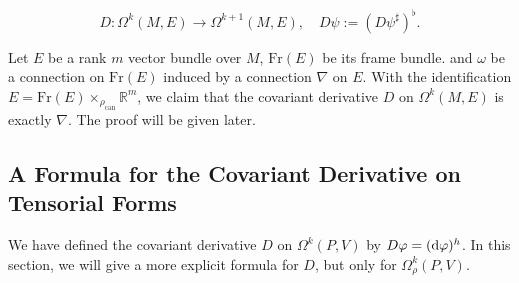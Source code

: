 \begin{equation*}
    D: \Omega^k(M, E) \to \Omega^{k+1}(M, E), \quad D\psi := (D\psi^\sharp)^\flat.
\end{equation*}
\begin{example}
    Let $E$ be a rank $m$ vector bundle over $M$, $\mathrm{Fr}(E)$ be its frame bundle.
    and $\omega$ be a connection on $\mathrm{Fr}(E)$ induced by a connection $\nabla$ on $E$. 
    With the identification $E = \mathrm{Fr}(E)\times_{\rho_{\mathrm{can}}}\mathbb{R}^m$, 
    we claim that the covariant derivative $D$ on $\Omega^k(M, E)$ is exactly $\nabla$. 
    The proof will be given later. 
\end{example}

\subsection{A Formula for the Covariant Derivative on Tensorial Forms}
We have defined the covariant derivative $D$ on $\Omega^k(P, V)$ by $D\varphi = ({\rm d}\varphi)^h$.
In this section, we will give a more explicit formula for $D$, but only for $\Omega^k_{\rho}(P, V)$. 


